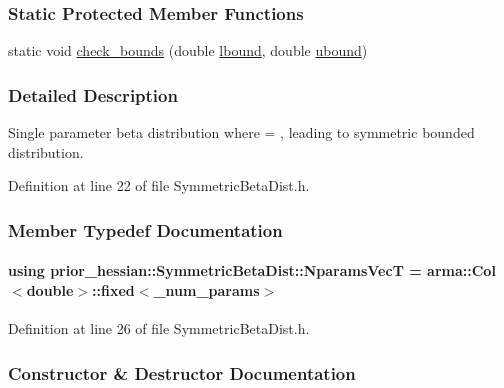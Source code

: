 \subsubsection*{Static Protected Member Functions}
\begin{DoxyCompactItemize}
\item 
static void \hyperlink{classprior__hessian_1_1UnivariateDist_aec85554be4019eb2c5d92203a4e6d9f8}{check\+\_\+bounds} (double \hyperlink{classprior__hessian_1_1SymmetricBetaDist_a744ee31960d652c397f1b9ac1df4f1e6}{lbound}, double \hyperlink{classprior__hessian_1_1SymmetricBetaDist_ad1766580dc336913711d6e1ed94a7f7a}{ubound})
\end{DoxyCompactItemize}


\subsubsection{Detailed Description}
Single parameter beta distribution where  = , leading to symmetric bounded distribution. 



Definition at line 22 of file Symmetric\+Beta\+Dist.\+h.



\subsubsection{Member Typedef Documentation}
\paragraph[{\texorpdfstring{Nparams\+VecT}{NparamsVecT}}]{\setlength{\rightskip}{0pt plus 5cm}using {\bf prior\+\_\+hessian\+::\+Symmetric\+Beta\+Dist\+::\+Nparams\+VecT} =  arma\+::\+Col$<$double$>$\+::fixed$<$\+\_\+num\+\_\+params$>$}\hypertarget{classprior__hessian_1_1SymmetricBetaDist_a62959cfb48b557fde35822b1c0d9a48d}{}\label{classprior__hessian_1_1SymmetricBetaDist_a62959cfb48b557fde35822b1c0d9a48d}


Definition at line 26 of file Symmetric\+Beta\+Dist.\+h.



\subsubsection{Constructor \& Destructor Documentation}
